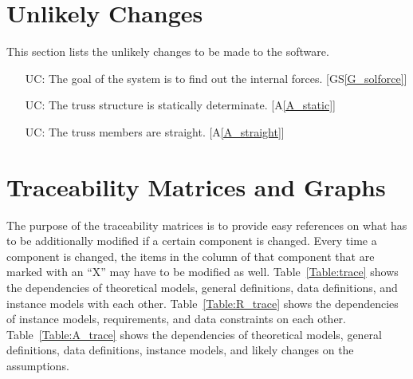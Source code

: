 \documentclass[12pt]{article}
\newcommand{\aref}[1]{A\ref{#1}}
\newcommand{\gsref}[1]{GS\ref{#1}}
\newcounter{ucnum} %
\begin{document}
\section{Unlikely Changes}    
This section lists the unlikely changes to be made to the software.
\noindent \begin{itemize}

\item[UC\refstepcounter{ucnum}\theucnum\label{UC_sysgoal}:] The goal of the 
system is to find out the internal forces. [\gsref{G_solforce}]

\item[UC\refstepcounter{ucnum}\theucnum\label{UC_static}:] The truss structure 
is statically determinate. [\aref{A_static}]

\item[UC\refstepcounter{ucnum}\theucnum\label{UC_straight}:] The truss members 
are straight. [\aref{A_straight}]

\end{itemize}

\section{Traceability Matrices and Graphs}

The purpose of the traceability matrices is to provide easy references on what
has to be additionally modified if a certain component is changed. Every time a
component is changed, the items in the column of that component that are marked
with an ``X'' may have to be modified as well. Table~\ref{Table:trace} shows 
the dependencies of theoretical models, general definitions, data definitions, 
and instance models  with each other. Table~\ref{Table:R_trace} shows the
dependencies of instance models, requirements, and data constraints on each
other. Table~\ref{Table:A_trace} shows the dependencies of theoretical models,
general definitions, data definitions, instance models, and likely changes on
the assumptions.
\end{document}
